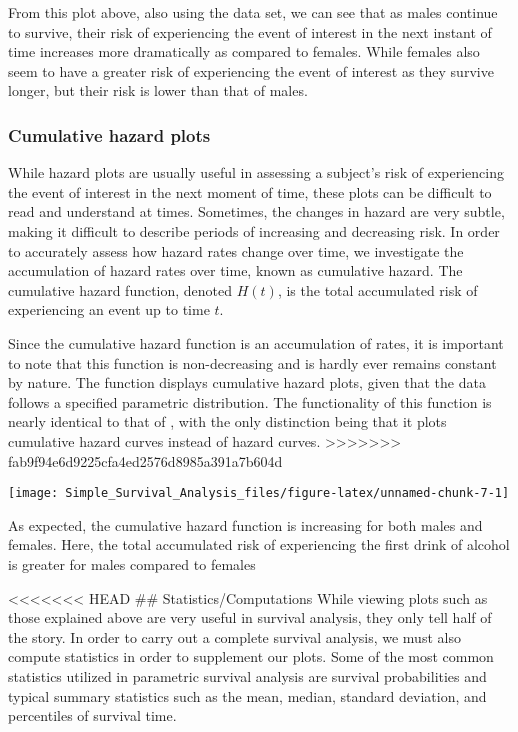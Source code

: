 From this plot above, also using the  data set, we can
see that as males continue to survive, their risk of experiencing the
event of interest in the next instant of time increases more
dramatically as compared to females. While females also seem to have a
greater risk of experiencing the event of interest as they survive
longer, but their risk is lower than that of males.

\hypertarget{cumulative-hazard-plots-1}{%
\subsubsection{Cumulative hazard
plots}\label{cumulative-hazard-plots-1}}

While hazard plots are usually useful in assessing a subject's risk of
experiencing the event of interest in the next moment of time, these
plots can be difficult to read and understand at times. Sometimes, the
changes in hazard are very subtle, making it difficult to describe
periods of increasing and decreasing risk. In order to accurately assess
how hazard rates change over time, we investigate the accumulation of
hazard rates over time, known as cumulative hazard. The cumulative
hazard function, denoted \(H(t)\), is the total accumulated risk of
experiencing an event up to time \(t\).

Since the cumulative hazard function is an accumulation of rates, it is
important to note that this function is non-decreasing and is hardly
ever remains constant by nature. The  function
displays cumulative hazard plots, given that the data follows a
specified parametric distribution. The functionality of this function is
nearly identical to that of , with the only distinction
being that it plots cumulative hazard curves instead of hazard curves.
\textgreater{}\textgreater{}\textgreater{}\textgreater{}\textgreater{}\textgreater{}\textgreater{}
fab9f94e6d9225cfa4ed2576d8985a391a7b604d

\begin{Schunk}

\texttt{[image: Simple\_Survival\_Analysis\_files/figure-latex/unnamed-chunk-7-1]} \end{Schunk}

As expected, the cumulative hazard function is increasing for both males
and females. Here, the total accumulated risk of experiencing the first
drink of alcohol is greater for males compared to females

\textless{}\textless{}\textless{}\textless{}\textless{}\textless{}\textless{}
HEAD \#\# Statistics/Computations While viewing plots such as those
explained above are very useful in survival analysis, they only tell
half of the story. In order to carry out a complete survival analysis,
we must also compute statistics in order to supplement our plots. Some
of the most common statistics utilized in parametric survival analysis
are survival probabilities and typical summary statistics such as the
mean, median, standard deviation, and percentiles of survival time.


